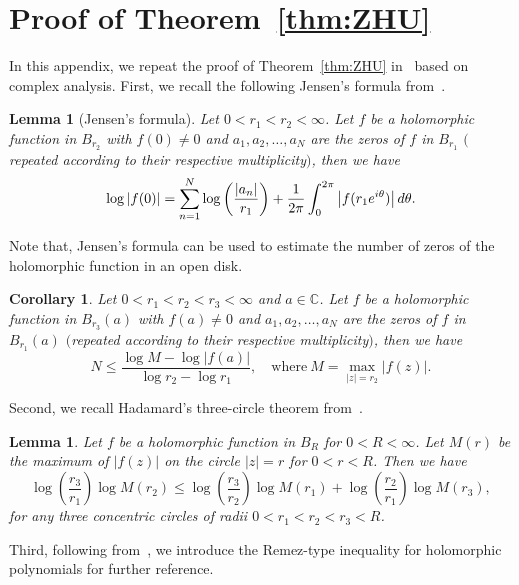\documentclass[a4paper,reqno]{amsart}
\newtheorem{corollary}[theorem]{Corollary}
\newtheorem{lemma}[theorem]{Lemma}
\theoremstyle{definition}
\numberwithin{equation}{section}
\def \d {{\rm{d}}}
\begin{document}
\appendix
\section{Proof of Theorem~\ref{thm:ZHU}}\label{AppA}

In this appendix, we repeat the proof of Theorem~\ref{thm:ZHU} in~\cite{ZHU} based on complex analysis. First, we recall the following Jensen's formula from~\cite[Theorem 15.18]{Rudin}.

\begin{lemma}[Jensen's formula]
Let $0<r_{1}<r_{2}<\infty$. Let $f$ be a holomorphic function in ${B}_{r_{2}}$ with $f(0)\ne 0$ and $a_{1}, a_{2},\dots,a_{N}$ are the zeros of $f$ in $B_{r_{1}}$ $($repeated according to their respective multiplicity$)$, then we have 
\begin{equation*}
    \log |f(0)|=\sum_{n=1}^{N}\log \left(\frac{|a_{n}|}{r_{1}}\right)+\frac{1}{2\pi }\int_{0}^{2\pi}\left|f(r_{1}e^{i\theta})\right|\d \theta.
\end{equation*}
    
\end{lemma}

Note that, Jensen's formula can be used to estimate the number of zeros of the holomorphic function in an open disk.
\begin{corollary}\label{coro:zero}
Let $0<r_{1}<r_{2}<r_{3}<\infty$ and $a\in \mathbb{C}$. Let $f$ be a holomorphic function in ${B}_{r_{3}}(a)$ with $f(a)\ne 0$ and $a_{1}, a_{2},\dots,a_{N}$ are the zeros of $f$ in $B_{r_{1}}(a)$ $($repeated according to their respective multiplicity$)$, then we have   
\begin{equation*}
    N\le \frac{\log M-\log |f(a)|}{\log r_{2}-\log r_{1}},\quad \mbox{where}\ M=\max_{|z|=r_{2}}|f(z)|.
\end{equation*}
\end{corollary}

Second, we recall Hadamard's three-circle theorem from~\cite[Page 264]{Rudin}.
\begin{lemma}\label{le:Hada}
    Let $f$ be a holomorphic function in $B_{R}$ for $0<R<\infty$.
    Let $M(r)$ be the maximum of $|f(z)|$ on the circle $|z|=r$ for $0<r<R$. Then we have 
   \begin{equation*}
       \log\left(\frac{r_{3}}{r_{1}}\right)\log M(r_{2})\le 
       \log\left(\frac{r_{3}}{r_{2}}\right)\log M(r_{1})
       +\log\left(\frac{r_{2}}{r_{1}}\right)\log M(r_{3}),
       \end{equation*}
       for any three concentric circles of radii $0<r_{1}<r_{2}<r_{3}<R$.
 \end{lemma}
Third, following from~\cite[Theorem 4.3]{FY}, we introduce the Remez-type inequality for holomorphic polynomials for further reference.
\end{document}
